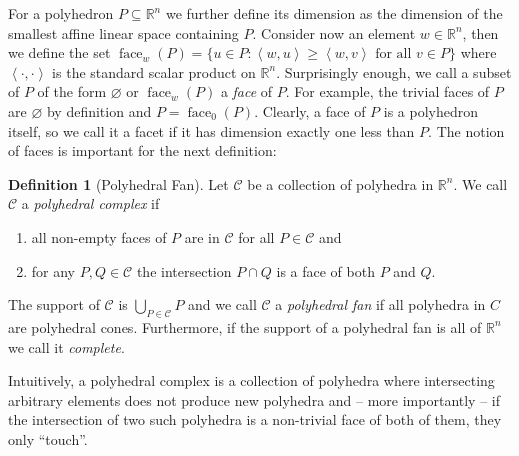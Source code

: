 \documentclass[
  paper=a4,
  titlepage,
  bibliography=totoc,
  listof=totoc,
  pagesize=pdftex
]{scrartcl}
\numberwithin{figure}{section}
\numberwithin{equation}{section}
\numberwithin{table}{section}
\newcommand*\setR{\mathds{R}}
\newcommand*\ideal[1]{\left\langle #1 \right\rangle}
\DeclareMathOperator{\face}{face}
\theoremstyle{definition}
\newtheorem{definition}{Definition}
\numberwithin{definition}{section}
\begin{document}
For a polyhedron $P \subseteq \setR^n$ we further define its dimension as the dimension of
the smallest affine linear space containing $P$. Consider now an element $w \in \setR^n$,
then we define the set $\face_w(P) = \{ u \in P : \ideal{w,u} \geq \ideal{w,v} \text{ for
all } v\in P\}$ where $\ideal{\cdot,\cdot}$ is the standard scalar product on $\setR^n$.
Surprisingly enough, we call a subset of $P$ of the form $\varnothing$ or $\face_w(P)$ a
\emph{face} of $P$. For example, the trivial faces of $P$ are $\varnothing$ by definition
and $P = \face_0(P)$. Clearly, a face of $P$ is a polyhedron itself, so we call it a facet
if it has dimension exactly one less than $P$. The notion of faces is important for the
next definition:

\begin{definition}[Polyhedral Fan]
  Let $\mathcal C$ be a collection of polyhedra in $\setR^n$. We call $\mathcal C$ a
  \emph{polyhedral complex} if
  \begin{enumerate}
    \item all non-empty faces of $P$ are in $\mathcal C$ for all $P \in \mathcal C$ and
    \item for any $P,Q \in \mathcal C$ the intersection $P\cap Q$ is a face of both $P$
      and $Q$.
  \end{enumerate}
  The support of $\mathcal C$ is $\bigcup_{P\in\mathcal C}P$ and we call $\mathcal C$ a
  \emph{polyhedral fan} if all polyhedra in $C$ are polyhedral cones. Furthermore, if the
  support of a polyhedral fan is all of $\setR^n$ we call it \emph{complete}.
  \label{def:polyhedralFan}
\end{definition}

Intuitively, a polyhedral complex is a collection of polyhedra where intersecting
arbitrary elements does not produce new polyhedra and -- more importantly -- if the
intersection of two such polyhedra is a non-trivial face of both of them, they only
\enquote{touch}.
\end{document}
